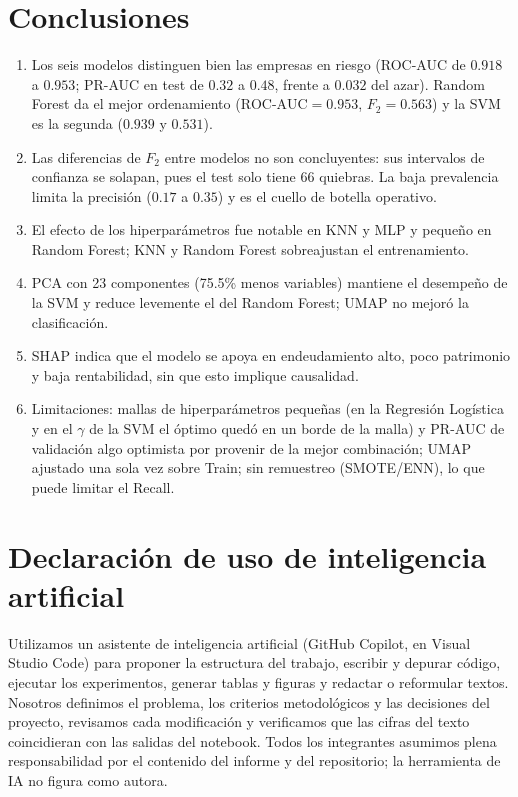 \documentclass[journal]{IEEEtran}
\begin{document}
\section{Conclusiones}
\begin{enumerate}
    \item Los seis modelos distinguen bien las empresas en riesgo (ROC-AUC de $0.918$ a $0.953$; PR-AUC en test de $0.32$ a $0.48$, frente a $0.032$ del azar). Random Forest da el mejor ordenamiento ($\text{ROC-AUC}=0.953$, $F_2=0.563$) y la SVM es la segunda ($0.939$ y $0.531$).
    \item Las diferencias de $F_2$ entre modelos no son concluyentes: sus intervalos de confianza se solapan, pues el test solo tiene 66 quiebras. La baja prevalencia limita la precisión ($0.17$ a $0.35$) y es el cuello de botella operativo.
    \item El efecto de los hiperparámetros fue notable en KNN y MLP y pequeño en Random Forest; KNN y Random Forest sobreajustan el entrenamiento.
    \item PCA con 23 componentes (75.5\% menos variables) mantiene el desempeño de la SVM y reduce levemente el del Random Forest; UMAP no mejoró la clasificación.
    \item SHAP indica que el modelo se apoya en endeudamiento alto, poco patrimonio y baja rentabilidad, sin que esto implique causalidad.
    \item Limitaciones: mallas de hiperparámetros pequeñas (en la Regresión Logística y en el $\gamma$ de la SVM el óptimo quedó en un borde de la malla) y PR-AUC de validación algo optimista por provenir de la mejor combinación; UMAP ajustado una sola vez sobre Train; sin remuestreo (SMOTE/ENN), lo que puede limitar el Recall.
\end{enumerate}

\FloatBarrier
\section*{Declaración de uso de inteligencia artificial}
Utilizamos un asistente de inteligencia artificial (GitHub Copilot, en Visual Studio Code) para proponer la estructura del trabajo, escribir y depurar código, ejecutar los experimentos, generar tablas y figuras y redactar o reformular textos. Nosotros definimos el problema, los criterios metodológicos y las decisiones del proyecto, revisamos cada modificación y verificamos que las cifras del texto coincidieran con las salidas del notebook. Todos los integrantes asumimos plena responsabilidad por el contenido del informe y del repositorio; la herramienta de IA no figura como autora.



\end{document}
